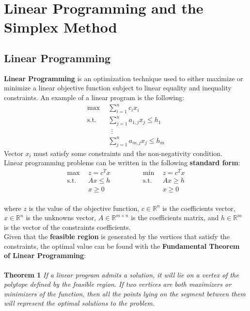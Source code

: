 \documentclass{article}
\begin{document}
\newpage

\section{Linear Programming and the Simplex Method}
\subsection{Linear Programming}
\textbf{Linear Programming} is an optimization technique used to either maximize or minimize a linear objective function subject to linear equality and inequality constraints. An example of a linear program is the following:
\begin{align*}
	\max~~ & \sum_{i = 1}^n c_ix_i \\
	\text{s.t.}~~ & \sum_{j = 1}^n a_{1,j}x_j \leq h_1 \\
	~~&~~ \vdots \\
	~~& \sum_{j = 1}^n a_{m,j}x_j \leq h_m
\end{align*}
Vector $x_i$ must satisfy some constraints and the non-negativity condition. \\
Linear programming problems can be written in the following \textbf{standard form}:
\begin{equation*}
  \begin{split}
    \max~~ & z = c^Tx \\
	\text{s.t.}~~ & Ax \leq h \\
	~~& x \geq 0
  \end{split}
\quad\quad\quad\quad
  \begin{split}
    \min~~ & z = c^Tx \\
	\text{s.t.}~~ & Ax \geq h \\
	~~& x \geq 0
  \end{split}
\end{equation*} \\
where $z $ is the value of the objective function, $c \in \mathbb{R}^n$ is the coefficients vector, $x \in \mathbb{R}^n$ is the unknowns vector, $A \in \mathbb{R}^{m \times n}$ is the coefficients matrix, and $h \in \mathbb{R}^m$ is the vector of the constraints coefficients. \\
Given that the \textbf{feasible region} is generated by the vertices that satisfy the constraints, the optimal value can be found with the \textbf{Fundamental Theorem of Linear Programming}: \\ \\
\textbf{Theorem 1} \textit{If a linear program admits a solution, it will lie on a vertex of the polytope defined by the feasible region. If two vertices are both maximizers or minimizers of the function, then all the points lying on the segment between them will represent the optimal solutions to the problem.}
\end{document}
